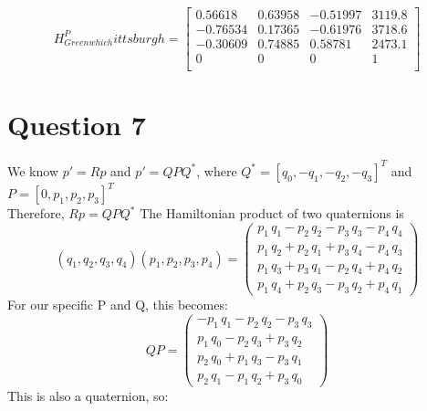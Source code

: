 \documentclass[11pt]{article}
\begin{document}
$$
H_{Greenwhich}^Pittsburgh = 
\begin{bmatrix}
    0.56618  &0.63958  & -0.51997 &    3119.8  \\
    -0.76534  &0.17365 &  -0.61976&     3718.6 \\
    -0.30609  &0.74885 &   0.58781&     2473.1 \\
           0  &      0 &         0&          1 \\
\end{bmatrix}
$$


\section{Question 7}
We know $p' = Rp$ and $p' = QPQ^*$, where $Q^*=[q_0,-q_1,-q_2,-q_3]^T$ and $P=[0,p_1,p_2,p_3]^T$\\
Therefore, $Rp = QPQ^*$
The Hamiltonian product of two quaternions is 
$$
(q_1,q_2,q_3,q_4)(p_1,p_2,p_3,p_4)=\left(\begin{array}{c} p_{1}\,q_{1}-p_{2}\,q_{2}-p_{3}\,q_{3}-p_{4}\,q_{4}\\ p_{1}\,q_{2}+p_{2}\,q_{1}+p_{3}\,q_{4}-p_{4}\,q_{3}\\ p_{1}\,q_{3}+p_{3}\,q_{1}-p_{2}\,q_{4}+p_{4}\,q_{2}\\ p_{1}\,q_{4}+p_{2}\,q_{3}-p_{3}\,q_{2}+p_{4}\,q_{1} \end{array}\right)
$$
For our specific P and Q, this becomes:
$$
QP=\left(\begin{array}{c} -p_{1}\,q_{1}-p_{2}\,q_{2}-p_{3}\,q_{3}\\ p_{1}\,q_{0}-p_{2}\,q_{3}+p_{3}\,q_{2}\\ p_{2}\,q_{0}+p_{1}\,q_{3}-p_{3}\,q_{1}\\ p_{2}\,q_{1}-p_{1}\,q_{2}+p_{3}\,q_{0} \end{array}\right)
$$
This is also a quaternion, so:
\end{document}
